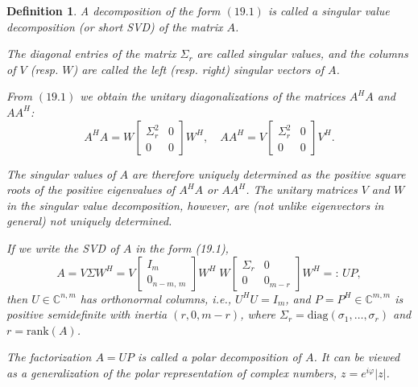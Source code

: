 \documentclass{article}
\newtheorem{definition}{Definition}[section]
\begin{document}
\vspace{1cm}

\begin{definition}
A decomposition of the form \((19.1)\) is called a \emph{singular value decomposition}  
(or short \emph{SVD}) of the matrix \(A\).  

The diagonal entries of the matrix \(\Sigma_r\) are called \emph{singular values},  
and the columns of \(V\) (resp. \(W\)) are called the \emph{left} (resp. \emph{right})  
singular vectors of \(A\).

From \((19.1)\) we obtain the unitary diagonalizations of the matrices \(A^H A\) and \(A A^H\):
\[
A^H A =
W
\begin{bmatrix}
\Sigma_r^2 & 0 \\
0 & 0
\end{bmatrix}
W^H,
\quad
A A^H =
V
\begin{bmatrix}
\Sigma_r^2 & 0 \\
0 & 0
\end{bmatrix}
V^H.
\]

The singular values of \(A\) are therefore uniquely determined as the positive square roots  
of the positive eigenvalues of \(A^H A\) or \(A A^H\).  
The unitary matrices \(V\) and \(W\) in the singular value decomposition, however, are  
(not unlike eigenvectors in general) not uniquely determined.

If we write the SVD of $A$ in the form (19.1),
\[
A = V \Sigma W^H
= V
\begin{bmatrix}
I_m \\[2pt]
0_{n-m,\,m}
\end{bmatrix}
W^H \;
W
\begin{bmatrix}
\Sigma_r & 0 \\
0 & 0_{m-r}
\end{bmatrix}
W^H
=:\, U P,
\]
then $U \in \mathbb{C}^{n,m}$ has orthonormal columns, i.e., $U^H U = I_m$, and
$P = P^H \in \mathbb{C}^{m,m}$ is positive semidefinite with inertia $(r,0,m-r)$,
where $\Sigma_r = \mathrm{diag}(\sigma_1,\dots,\sigma_r)$ and $r=\mathrm{rank}(A)$.

The factorization $A = U P$ is called a \emph{polar decomposition} of $A$.
It can be viewed as a generalization of the polar representation of complex numbers,
$z = e^{i\varphi}\lvert z\rvert$.

\end{definition}

\vspace{1cm}
\end{document}
